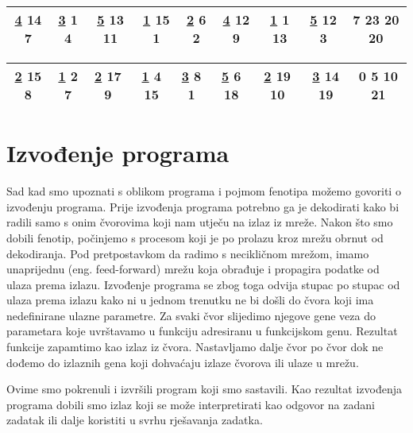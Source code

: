 \begin{table}[h!]
	\centering
	\begin{tabular}{ |c|c|c|c|c|c|c|c|c|  }
		\hline
		\underline{4} 14 7 & \underline{3} 1 4 & \underline{5} 13 11 & \underline{1} 15 1 & \underline{2} 6 2 & \underline{4} 12 9 & \underline{1} 1 13 & \underline{5} 12 3 & \textbf{7 23 20 20}\\
		\hline
	\end{tabular}
\end{table}

\begin{table}[h!]
	\centering
	\begin{tabular}{ |c|c|c|c|c|c|c|c|c|  }
		\hline
		\underline{2} 15 8 & \underline{1} 2 7 & \underline{2} 17 9 & \underline{1} 4 15 & \underline{3} 8 1 & \underline{5} 6 18 & \underline{2} 19 10 & \underline{3} 14 19 & \textbf{0 5 10 21}\\
		\hline
	\end{tabular}
\end{table}

  
 
\section{Izvođenje programa}  
\quad Sad kad smo upoznati s oblikom programa i pojmom fenotipa možemo govoriti o izvođenju programa. Prije izvođenja programa potrebno ga je dekodirati kako bi radili samo s onim čvorovima koji nam utječu na izlaz iz mreže. Nakon što smo dobili fenotip, počinjemo s procesom koji je po prolazu kroz mrežu obrnut od dekodiranja. Pod pretpostavkom da radimo s necikličnom mrežom, imamo unaprijednu (eng. feed-forward) mrežu koja obrađuje i propagira podatke od ulaza prema izlazu. Izvođenje programa se zbog toga odvija stupac po stupac od ulaza prema izlazu kako ni u jednom trenutku ne bi došli do čvora koji ima nedefinirane ulazne parametre. Za svaki čvor slijedimo njegove gene veza do parametara koje uvrštavamo u funkciju adresiranu u funkcijskom genu. Rezultat funkcije zapamtimo kao izlaz iz čvora. Nastavljamo dalje čvor po čvor dok ne dođemo do izlaznih gena koji dohvaćaju izlaze čvorova ili ulaze u mrežu. \par
Ovime smo pokrenuli i izvršili program koji smo sastavili. Kao rezultat izvođenja programa dobili smo izlaz koji se može interpretirati kao odgovor na zadani zadatak ili dalje koristiti u svrhu rješavanja zadatka.